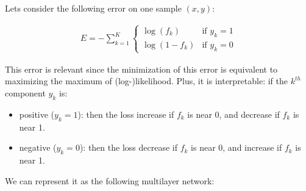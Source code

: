 Lets consider the following error on one sample $(x, y)$:

\begin{align}
	E = - \sum_{k=1}^K
  			  	\left\{
				    \begin{array}{ll}
				        \log (f_k) & \mbox{if } y_k =1 \\
				        \log (1 - f_k) & \mbox{if } y_k =0
				    \end{array}
				\right.
\end{align}

This error is relevant since the minimization of this error is equivalent to maximizing the maximum of (log-)likelihood.
Plus, it is interpretable: if the $k^{th}$ component $y_k$ is:
\begin{itemize}
	\item positive ($y_k=1$): then the loss increase if $f_k$ is near 0, and decrease if $f_k$ is near 1.
	\item negative ($y_k=0$): then the loss decrease if $f_k$ is near 0, and increase if $f_k$ is near 1.
\end{itemize}



We can represent it as the following multilayer network:


